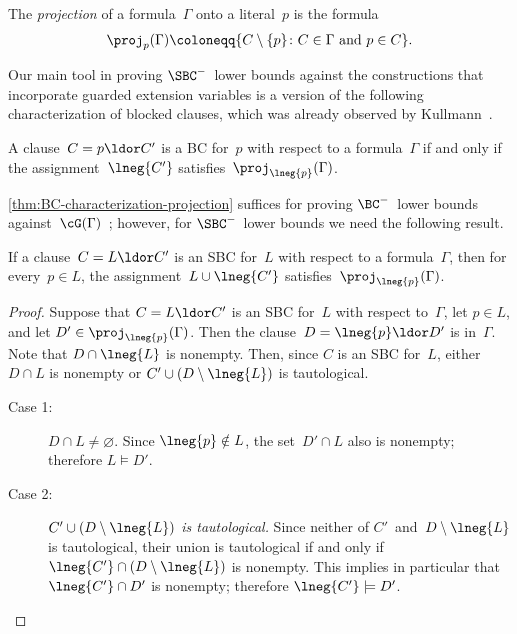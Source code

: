 \documentclass[10pt,a4paper]{article}
\begin{document}
\begin{definition}\label{def:projection}
  The \emph{projection} of a formula~$\Gamma$ onto a literal~$p$ is the formula
  \begin{equation*}
    \proj_p(\Gamma) \coloneqq \{C \setminus \{p\} \colon
    C \in \Gamma \text{ and } p \in C\}.
  \end{equation*}
\end{definition}

Our main tool in proving $\SBC^-$~lower bounds against
the constructions that incorporate guarded extension variables
is a version of the following characterization of blocked clauses,
which was already observed by Kullmann~\cite[see][Section~4]{Kul99b}.

\begin{lemma}[{\cite[Lemma~3.15]{YH23}}]\label{thm:BC-characterization-projection}
  A clause~$C = p \ldor C'$ is a BC for~$p$ with respect to a formula~$\Gamma$
  if and only if the assignment~$\lneg{C'}$ satisfies~$\proj_{\lneg{p}}(\Gamma)$.
\end{lemma}

\cref{thm:BC-characterization-projection} suffices for proving
$\BC^-$~lower bounds against~$\cG(\Gamma)$~\cite[see][Lemma~5.2]{YH23};
however, for $\SBC^-$~lower bounds we need the following result.

\begin{lemma}\label{thm:SBC-projection-onto-literal}
  If a clause~$C = L \ldor C'$ is an SBC
  for~$L$ with respect to a formula~$\Gamma$,
  then for every~$p \in L$, the assignment~$L \cup \lneg{C'}$
  satisfies~$\proj_{\lneg{p}}(\Gamma)$.
\end{lemma}
\begin{proof}
  Suppose that $C = L \ldor C'$ is an SBC for~$L$ with respect to~$\Gamma$,
  let $p \in L$, and let $D' \in \proj_{\lneg{p}}(\Gamma)$.
  Then the clause~$D = \lneg{p} \ldor D'$ is in~$\Gamma$.
  Note that $D \cap \lneg{L}$ is nonempty.
  Then, since $C$ is an SBC for~$L$, either $D \cap L$ is nonempty
  or $C' \cup (D \setminus \lneg{L})$ is tautological.

  \begin{description}
  \item[Case 1:] $D \cap L \neq \varnothing$.
    Since $\lneg{p} \notin L$, the set~$D' \cap L$ also is nonempty;
    therefore $L \models D'$.
  \item[Case 2:] \textit{$C' \cup (D \setminus \lneg{L})$ is tautological.}
    Since neither of $C'$~and~$D \setminus \lneg{L}$ is tautological,
    their union is tautological if and only if
    $\lneg{C'} \cap (D \setminus \lneg{L})$ is nonempty.
    This implies in particular that $\lneg{C'} \cap D'$ is nonempty;
    therefore $\lneg{C'} \models D'$. \qedhere
  \end{description}
\end{proof}
\end{document}
